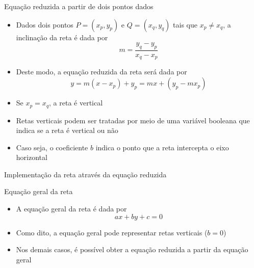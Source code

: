 \begin{frame}[fragile]{Equação reduzida a partir de dois pontos dados}

    \begin{itemize}
        \item Dados dois pontos $P = (x_p, y_p)$ e $Q = (x_q, y_q)$ tais que $x_p \neq x_q$, 
        a inclinação da reta é dada por
        \[
            m = \frac{y_q - y_p}{x_q - x_p}
        \]

        \item Deste modo, a equação reduzida da reta será dada por
        \[
            y = m(x - x_p) + y_p = mx + (y_p - mx_p)
        \]

        \item Se $x_p = x_q$, a reta é vertical


        \item Retas verticais podem ser tratadas por meio de uma variável booleana que indica
            se a reta é vertical ou não

        \item Caso seja, o coeficiente $b$ indica o ponto que a reta intercepta o eixo horizontal
    \end{itemize}

\end{frame}

\begin{frame}[fragile]{Implementação da reta através da equação reduzida}
\end{frame}

\begin{frame}[fragile]{Equação geral da reta}

    \begin{itemize}
        \item A equação geral da reta é dada por
        \[
            ax + by + c = 0
        \]

        \item Como dito, a equação geral pode representar retas verticais ($b = 0$)

        \item Nos demais casos, é possível obter a equação reduzida a partir da equação geral


    \end{itemize}

\end{frame}

